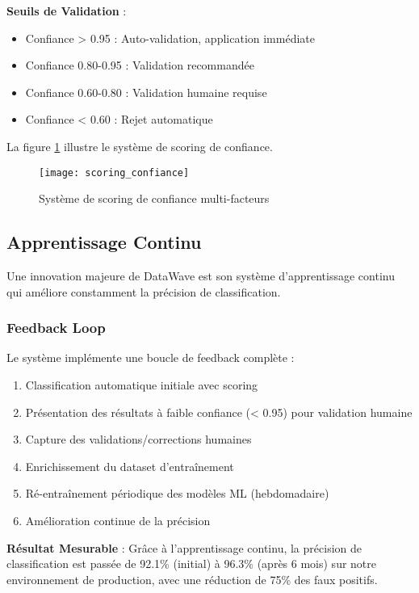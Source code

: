 \textbf{Seuils de Validation} :
\begin{itemize}
    \item Confiance > 0.95 : Auto-validation, application immédiate
    \item Confiance 0.80-0.95 : Validation recommandée
    \item Confiance 0.60-0.80 : Validation humaine requise
    \item Confiance < 0.60 : Rejet automatique
\end{itemize}

La figure \ref{fig:scoring_confiance} illustre le système de scoring de confiance.

\begin{figure}[htpb]
\centering
\texttt{[image: scoring\_confiance]}
\caption{Système de scoring de confiance multi-facteurs}
\label{fig:scoring_confiance}
\end{figure}

\subsection{Apprentissage Continu}

Une innovation majeure de DataWave est son système d'apprentissage continu qui améliore constamment la précision de classification.

\subsubsection{Feedback Loop}

Le système implémente une boucle de feedback complète :
\begin{enumerate}
    \item Classification automatique initiale avec scoring
    \item Présentation des résultats à faible confiance (< 0.95) pour validation humaine
    \item Capture des validations/corrections humaines
    \item Enrichissement du dataset d'entraînement
    \item Ré-entraînement périodique des modèles ML (hebdomadaire)
    \item Amélioration continue de la précision
\end{enumerate}

\textbf{Résultat Mesurable} : Grâce à l'apprentissage continu, la précision de classification est passée de 92.1\% (initial) à 96.3\% (après 6 mois) sur notre environnement de production, avec une réduction de 75\% des faux positifs.

